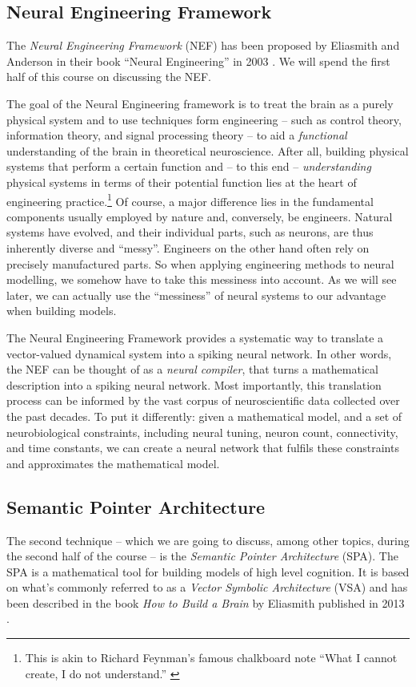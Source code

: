 \documentclass[10pt,letterpaper,oneside]{article}
\begin{document}
\subsection{Neural Engineering Framework}
The \emph{Neural Engineering Framework} (NEF) has been proposed by Eliasmith and Anderson in their book \enquote{Neural Engineering} in 2003 \cite{eliasmith2003neural}. We will spend the first half of this course on discussing the NEF.

The goal of the Neural Engineering framework is to treat the brain as a purely physical system and to use techniques form engineering -- such as control theory, information theory, and signal processing theory -- to aid a \emph{functional} understanding of the brain in theoretical neuroscience. After all, building physical systems that perform a certain function and -- to this end -- \emph{understanding} physical systems in terms of their potential function lies at the heart of engineering practice.\footnote{This is akin to Richard Feynman's famous chalkboard note \enquote{What I cannot create, I do not understand.} \cite{richard1988richard}} Of course, a major difference lies in the fundamental components usually employed by nature and, conversely, be engineers. Natural systems have evolved, and their individual parts, such as neurons, are thus inherently diverse and \enquote{messy}. Engineers on the other hand often rely on precisely manufactured parts. So when applying engineering methods to neural modelling, we somehow have to take this messiness into account. As we will see later, we can actually use the \enquote{messiness} of neural systems to our advantage when building models.

The Neural Engineering Framework provides a systematic way to translate a vector-valued dynamical system into a spiking neural network. In other words, the NEF can be thought of as a \emph{neural compiler}, that turns a mathematical description into a spiking neural network. Most importantly, this translation process can be informed by the vast corpus of neuroscientific data collected over the past decades. To put it differently: given a mathematical model, and a set of neurobiological constraints, including neural tuning, neuron count, connectivity, and time constants, we can create a neural network that fulfils these constraints and approximates the mathematical model.

\subsection{Semantic Pointer Architecture}
The second technique -- which we are going to discuss, among other topics, during the second half of the course -- is the \emph{Semantic Pointer Architecture} (SPA). The SPA is a mathematical tool for building models of high level cognition. It is based on what's commonly referred to as a \emph{Vector Symbolic Architecture} (VSA) and has been described in the book \emph{How to Build a Brain} by Eliasmith published in 2013 \cite{eliasmith2013how}.
\end{document}
